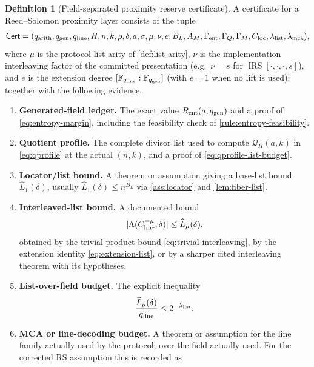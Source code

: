 \documentclass[11pt]{article}
\theoremstyle{definition}
\newtheorem{definition}[theorem]{Definition}
\newcommand{\F}{\mathbb F}
\newcommand{\IRS}{\operatorname{IRS}}
\newcommand{\Qprof}{\mathcal Q}
\newcommand{\qgen}{q_{\rm gen}}
\newcommand{\qarith}{q_{\rm arith}}
\newcommand{\qline}{q_{\rm line}}
\newcommand{\entres}{R_{\rm ent}}
\newcommand{\cert}{\mathsf{Cert}}
\newcommand{\Int}[2]{#1^{\equiv #2}}
\begin{document}
\begin{definition}[Field-separated proximity reserve certificate]
\label{def:cert}
A certificate for a Reed--Solomon proximity layer consists of the tuple
\[
\begin{gathered}
        \cert=(\qarith,\qgen,\qline,H,n,k,\rho,\delta,a,\sigma,
        \mu,\nu,e,B_L,A_M,
        \Gamma_{\rm ent},\Gamma_Q,\Gamma_M,C_{\rm loc},
        \lambda_{\rm list},\lambda_{\rm mca}),
\end{gathered}
\]
where $\mu$ is the protocol list arity of \cref{def:list-arity}, $\nu$ is the implementation interleaving factor of the committed presentation (e.g.\ $\nu=s$ for $\IRS[\cdot,\cdot,\cdot,s]$), and $e$ is the extension degree $[\F_{\qline}:\F_{\qgen}]$ (with $e=1$ when no lift is used); together with the following evidence.
\begin{enumerate}[label=(\alph*),leftmargin=2.2em]
\item \textbf{Generated-field ledger.}  The exact value $\entres(a;\qgen)$ and a proof of \eqref{eq:entropy-margin}, including the feasibility check of \cref{rule:entropy-feasibility}.
\item \textbf{Quotient profile.}  The complete divisor list used to compute $\Qprof_H(a,k)$ in \eqref{eq:qprofile} at the actual $(n,k)$, and a proof of \eqref{eq:qprofile-list-budget}.
\item \textbf{Locator/list bound.}  A theorem or assumption giving a base-list bound $\widehat L_1(\delta)$, usually $\widehat L_1(\delta)\le n^{B_L}$ via \cref{ass:locator} and \cref{lem:fiber-list}.
\item \textbf{Interleaved-list bound.}  A documented bound
\begin{equation}
\label{eq:interleaved-list-bound}
        |\Lambda(\Int{C_{\rm line}}{\mu},\delta)|
        \le \widehat L_{\mu}(\delta),
\end{equation}
obtained by the trivial product bound \eqref{eq:trivial-interleaving}, by the extension identity \eqref{eq:extension-list}, or by a sharper cited interleaving theorem with its hypotheses.
\item \textbf{List-over-field budget.}  The explicit inequality
\begin{equation}
\label{eq:list-field-budget}
        \frac{\widehat L_{\mu}(\delta)}{\qline}
        \le 2^{-\lambda_{\rm list}} .
\end{equation}
\item \textbf{MCA or line-decoding budget.}  A theorem or assumption for the line family actually used by the protocol, over the field actually used.  For the corrected RS assumption this is recorded as

\end{enumerate}
\end{definition}
\end{document}
